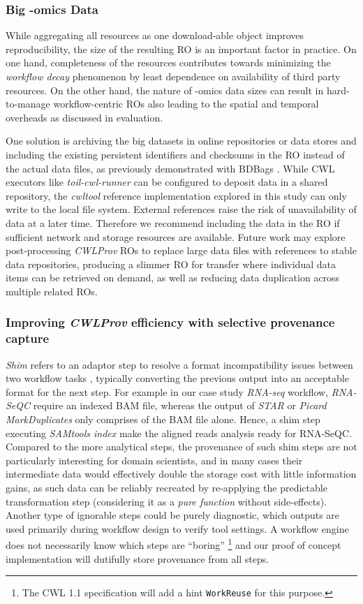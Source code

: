 \documentclass[a4paper,num-refs]{oup-contemporary}
\begin{document}
\subsubsection{\textcolor{black}Big -omics Data}
While aggregating all resources as one download-able object improves reproducibility, the size of the resulting RO is an important factor in practice. On one hand, completeness of the resources contributes towards minimizing the \textit{workflow decay} phenomenon by least dependence on availability of third party resources. On the other hand, the nature of -omics data sizes can result in hard-to-manage workflow-centric ROs also leading to the spatial and temporal overheads as discussed in evaluation. 

One solution is archiving the big datasets in online repositories or data stores and including the existing persistent identifiers and checksums in the RO instead of the actual data files, as previously demonstrated with BDBags \citep{chard_2016, madduri_2018}. While CWL executors like \textit{toil-cwl-runner} can be configured to deposit data in a shared repository, the \textit{cwltool} reference implementation explored in this study can only write to the local file system. External references raise the risk of unavailability of data at a later time. Therefore we recommend including the data in the RO if sufficient network and storage resources are available. Future work may explore post-processing \textit{CWLProv} ROs to replace large data files with references to stable data repositories, producing a slimmer RO for transfer where individual data items can be retrieved on demand, as well as reducing data duplication across multiple related ROs.

\subsubsection{\textcolor{black}Improving \textit{CWLProv} efficiency with selective provenance capture}
 \textit{Shim} refers to an adaptor step to resolve a format incompatibility issues between two workflow tasks \citep{Mohan2014}, typically converting the previous output into an acceptable format for the next step. For example in our case study \textit{RNA-seq} workflow, \textit{RNA-SeQC} require an indexed BAM file, whereas the output of \textit{STAR} or \textit{Picard MarkDuplicates} only comprises of the BAM file alone. Hence, a shim step executing \textit{SAMtools index} make the aligned reads analysis ready for RNA-SeQC. Compared to the more analytical steps, the provenance of such shim steps are not particularly interesting for domain scientists, and in many cases their intermediate data would effectively double the storage cost with little information gains, as such data can be reliably recreated by re-applying the predictable transformation step (considering it as a \textit{pure function} without side-effects). Another type of ignorable steps could be purely diagnostic, which outputs are used primarily during workflow design to verify tool settings.  A workflow engine does not necessarily know which steps are ``boring'' \footnote{The CWL 1.1 specification will add a hint \texttt{WorkReuse} for this purpose.} and our proof of concept implementation will dutifully store provenance from all steps. 
 
\end{document}
